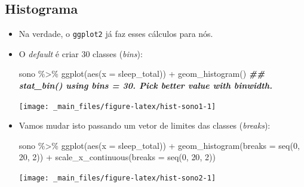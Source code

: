 \documentclass[
  11pt]{report}
\newenvironment{Shaded}{\begin{snugshade}}{\end{snugshade}}
\newcommand{\AttributeTok}[1]{\textcolor[rgb]{0.77,0.63,0.00}{#1}}
\newcommand{\DecValTok}[1]{\textcolor[rgb]{0.00,0.00,0.81}{#1}}
\newcommand{\DocumentationTok}[1]{\textcolor[rgb]{0.56,0.35,0.01}{\textbf{\textit{#1}}}}
\newcommand{\FunctionTok}[1]{\textcolor[rgb]{0.00,0.00,0.00}{#1}}
\newcommand{\NormalTok}[1]{#1}
\newcommand{\SpecialCharTok}[1]{\textcolor[rgb]{0.00,0.00,0.00}{#1}}
\begin{document}
\hypertarget{histograma}{%
\subsection{Histograma}\label{histograma}}

\begin{itemize}
\item
  Na verdade, o \texttt{ggplot2} já faz esses cálculos para nós.
\item
  O \emph{default} é criar \(30\) classes (\emph{bins}):

\begin{Shaded}
\begin{Highlighting}[]
\NormalTok{sono }\SpecialCharTok{\%\textgreater{}\%} 
  \FunctionTok{ggplot}\NormalTok{(}\FunctionTok{aes}\NormalTok{(}\AttributeTok{x =}\NormalTok{ sleep\_total)) }\SpecialCharTok{+}
    \FunctionTok{geom\_histogram}\NormalTok{()}
\DocumentationTok{\#\# \textasciigrave{}stat\_bin()\textasciigrave{} using \textasciigrave{}bins = 30\textasciigrave{}. Pick better value with \textasciigrave{}binwidth\textasciigrave{}.}
\end{Highlighting}
\end{Shaded}

  \begin{center}\texttt{[image: \_main\_files/figure-latex/hist-sono1-1]} \end{center}
\item
  Vamos mudar isto passando um vetor de limites das classes (\emph{breaks}):

\begin{Shaded}
\begin{Highlighting}[]
\NormalTok{sono }\SpecialCharTok{\%\textgreater{}\%} 
  \FunctionTok{ggplot}\NormalTok{(}\FunctionTok{aes}\NormalTok{(}\AttributeTok{x =}\NormalTok{ sleep\_total)) }\SpecialCharTok{+}
    \FunctionTok{geom\_histogram}\NormalTok{(}\AttributeTok{breaks =} \FunctionTok{seq}\NormalTok{(}\DecValTok{0}\NormalTok{, }\DecValTok{20}\NormalTok{, }\DecValTok{2}\NormalTok{)) }\SpecialCharTok{+}
    \FunctionTok{scale\_x\_continuous}\NormalTok{(}\AttributeTok{breaks =} \FunctionTok{seq}\NormalTok{(}\DecValTok{0}\NormalTok{, }\DecValTok{20}\NormalTok{, }\DecValTok{2}\NormalTok{))}
\end{Highlighting}
\end{Shaded}

  \begin{center}\texttt{[image: \_main\_files/figure-latex/hist-sono2-1]} \end{center}
\end{itemize}
\end{document}
